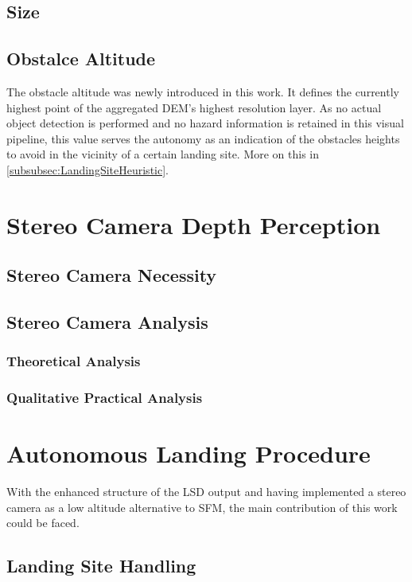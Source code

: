 \subsection{Size}

\subsection{Obstalce Altitude}

The obstacle altitude was newly introduced in this work. It defines the currently highest point of the aggregated DEM's highest resolution layer. As no actual object detection is performed and no hazard information is retained in this visual pipeline, this value serves the autonomy as an indication of the obstacles heights to avoid in the vicinity of a certain landing site. More on this in \cref{subsubsec:LandingSiteHeuristic}.

\section{Stereo Camera Depth Perception} \label{sec:StereoDepth}

\subsection{Stereo Camera Necessity}
\subsection{Stereo Camera Analysis}
\subsubsection{Theoretical Analysis}
\subsubsection{Qualitative Practical Analysis}

\section{Autonomous Landing Procedure}

With the enhanced structure of the LSD output and having implemented a stereo camera as a low altitude alternative to SFM, the main contribution of this work could be faced.

\subsection{Landing Site Handling}

